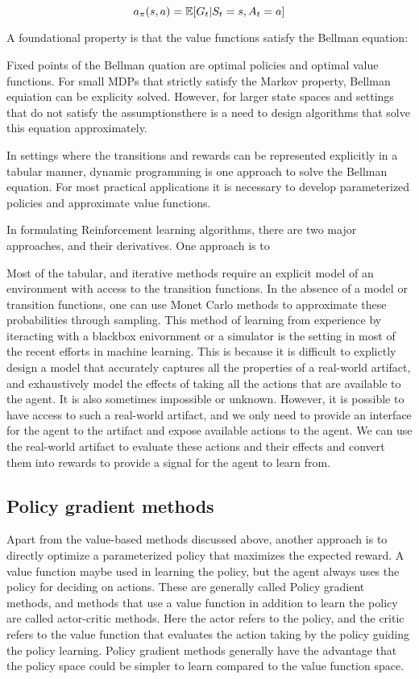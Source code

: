$$ a_{\pi}(s, a) =
	\mathbb{E}[G_t | S_t = s, A_t = a] $$

A foundational property is that the value
functions satisfy the Bellman equation:


Fixed points of the Bellman quation are optimal policies and optimal value functions.
For small MDPs that strictly satisfy the Markov property, Bellman equiation can be explicity
solved.
However, for larger state spaces and settings that do not satisfy the assumptionsthere is a need to
design algorithms that solve this equation approximately.

In settings where the transitions and rewards can be represented explicitly in a tabular manner,
dynamic programming is one approach to solve the Bellman equation.
For most practical applications it is necessary to develop parameterized policies and approximate
value functions.

In formulating Reinforcement learning algorithms, there are two major approaches, and their
derivatives.
One approach is to

Most of the tabular, and iterative methods require an
explicit model of an environment with access to the transition functions.
In the absence of a model or transition functions, one can use Monet Carlo methods to approximate
these probabilities through sampling.
This method of learning from experience by iteracting with a blackbox enivornment or a simulator is
the setting in most of the recent efforts in machine learning.
This is because it is difficult to explictly design a model that accurately captures all the
properties of a real-world artifact, and exhaustively model the effects of taking all the actions
that are available to the agent.
It is also sometimes impossible or unknown.
However, it is possible to have access to such a real-world artifact, and we only need to provide
an interface for the agent to the artifact and expose available actions to the agent.
We can use the real-world artifact to evaluate these actions and their effects and convert them
into rewards to provide a signal for the agent to learn from.

\label{sec:spg} \subsection{Policy gradient
	methods}\label{sec:pg}

Apart from the value-based methods discussed above, another approach is to directly optimize a
parameterized policy that maximizes the expected reward.
A value function maybe used in learning the policy, but the agent always uses the policy for
deciding on actions.
These are generally called Policy gradient methods, and methods that use a value function in
addition to learn the policy are called actor-critic methods.
Here the actor refers to the policy, and the critic refers to the value function that evaluates the
action taking by the policy guiding the policy learning.
Policy gradient methods generally have the advantage that the policy space could be simpler to
learn compared to the value function space.

